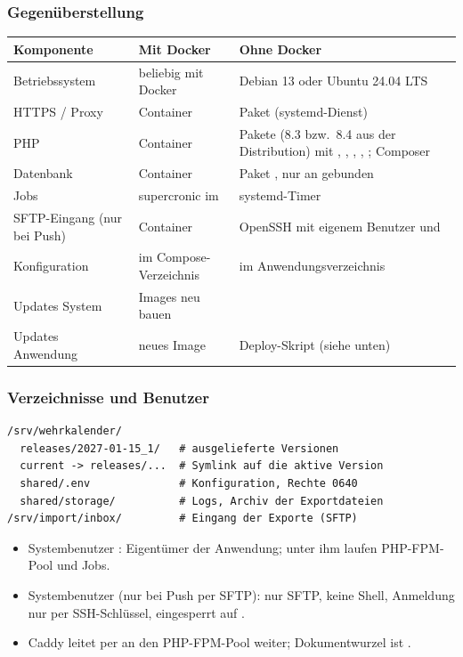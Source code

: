 \subsubsection*{Gegenüberstellung}

\begin{center}
\begin{tabularx}{\textwidth}{L{3.2cm}L{4.4cm}X}
\toprule
\textbf{Komponente} & \textbf{Mit Docker} & \textbf{Ohne Docker} \\
\midrule
Betriebssystem & beliebig mit Docker & Debian 13 oder Ubuntu 24.04 LTS \\
HTTPS / Proxy & Container  & Paket  (systemd-Dienst) \\
PHP & Container  & Pakete  (8.3 bzw.\ 8.4 aus der
  Distribution) mit , , ,
  , ; Composer \\
Datenbank & Container  & Paket , nur an
   gebunden \\
Jobs & supercronic im  & systemd-Timer \\
SFTP-Eingang (nur bei Push) & Container  & OpenSSH mit eigenem
  Benutzer und  \\
Konfiguration &  im Compose-Verzeichnis &  im
  Anwendungsverzeichnis \\
Updates System & Images neu bauen &  \\
Updates Anwendung & neues Image & Deploy-Skript (siehe unten) \\
\bottomrule
\end{tabularx}
\end{center}

\subsubsection*{Verzeichnisse und Benutzer}

\begin{lstlisting}
/srv/wehrkalender/
  releases/2027-01-15_1/   # ausgelieferte Versionen
  current -> releases/...  # Symlink auf die aktive Version
  shared/.env              # Konfiguration, Rechte 0640
  shared/storage/          # Logs, Archiv der Exportdateien
/srv/import/inbox/         # Eingang der Exporte (SFTP)
\end{lstlisting}

\begin{itemize}
  \item Systembenutzer : Eigentümer der Anwendung; unter ihm
        laufen PHP-FPM-Pool und Jobs.
  \item Systembenutzer  (nur bei Push per SFTP): nur SFTP, keine Shell, Anmeldung
        nur per SSH-Schlüssel, eingesperrt auf .
  \item Caddy leitet  per  an
        den PHP-FPM-Pool weiter; Dokumentwurzel ist
        .
\end{itemize}


